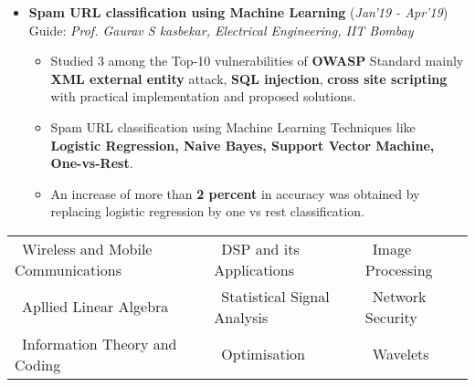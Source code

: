 \documentclass[10pt]{article}
\begin{document}
\begin{itemize}[leftmargin=0.4cm]
\begin{itemize}
	\end{itemize}\
	\vspace{-0.75cm}

\item \textbf{Spam URL classification using Machine Learning}
\hfill{(\textit{Jan'19 - Apr'19})}\\
Guide: \textit{Prof. Gaurav S kasbekar, Electrical Engineering, IIT Bombay}\\
\vspace{-0.7cm}
	\begin{itemize}
	\item Studied 3 among the Top-10 vulnerabilities of \textbf{OWASP} Standard mainly \textbf{XML external entity} attack, \textbf{SQL injection}, \textbf{cross site scripting} with practical implementation and proposed solutions.\vspace{-0.1cm}
	\item Spam URL classification using Machine Learning Techniques like \textbf{Logistic Regression, Naive Bayes, Support Vector Machine, One-vs-Rest}.\vspace{-0.1cm}
	\item An increase of more than \textbf{2 percent} in accuracy was obtained by replacing logistic regression by one vs rest classification.\vspace{-0.1cm}
    \end{itemize}

	\vspace{0.1cm}


\end{itemize}
\hspace{-0.17cm}\colorbox{bl}{}%
	\vspace{0.1cm} 


 	
		\begin{tabular}{ l l l }
		\hspace{0.55cm}\textbullet\ Wireless and Mobile Communications &  \textbullet\ DSP and its Applications & \textbullet\ Image Processing \\
		\hspace{0.55cm}\textbullet\ Apllied Linear Algebra & \textbullet\ Statistical Signal Analysis & \textbullet\ Network Security \\
		\hspace{0.55cm}\textbullet\ Information Theory and Coding & \textbullet\ Optimisation & \textbullet\ Wavelets\\
	\end{tabular}
	
\end{document}
